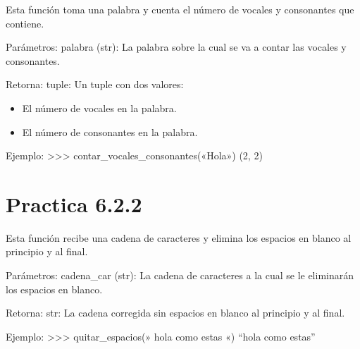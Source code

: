 \documentclass[letterpaper,10pt,spanish]{sphinxmanual}
\begin{document}
\begin{fulllineitems}
\label{\detokenize{pr6:pr6.2_1.contar_vocales_consonantes}}
\pysigstartsignatures
{}
\pysigstopsignatures
\sphinxAtStartPar
Esta función toma una palabra y cuenta el número de vocales y consonantes que contiene.

\sphinxAtStartPar
Parámetros:
palabra (str): La palabra sobre la cual se va a contar las vocales y consonantes.

\sphinxAtStartPar
Retorna:
tuple: Un tuple con dos valores:
\begin{itemize}
\item {} 
\sphinxAtStartPar
El número de vocales en la palabra.

\item {} 
\sphinxAtStartPar
El número de consonantes en la palabra.

\end{itemize}

\sphinxAtStartPar
Ejemplo:
\textgreater{}\textgreater{}\textgreater{} contar\_vocales\_consonantes(«Hola»)
(2, 2)

\end{fulllineitems}



\section{Practica 6.2.2}
\label{\detokenize{pr6:module-pr6.2_2}}\label{\detokenize{pr6:practica-6-2-2}}

\begin{fulllineitems}
\label{\detokenize{pr6:pr6.2_2.quitar_espacios}}
\pysigstartsignatures
{}
\pysigstopsignatures
\sphinxAtStartPar
Esta función recibe una cadena de caracteres y elimina los espacios en blanco al principio y al final.

\sphinxAtStartPar
Parámetros:
cadena\_car (str): La cadena de caracteres a la cual se le eliminarán los espacios en blanco.

\sphinxAtStartPar
Retorna:
str: La cadena corregida sin espacios en blanco al principio y al final.

\sphinxAtStartPar
Ejemplo:
\textgreater{}\textgreater{}\textgreater{} quitar\_espacios(»   hola como estas   «)
“hola como estas”

\end{fulllineitems}
\end{document}
